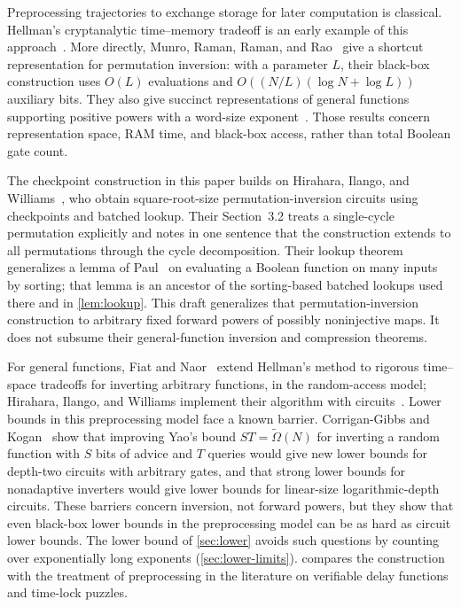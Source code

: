 \documentclass[11pt]{article}
\theoremstyle{definition}
\theoremstyle{remark}
\numberwithin{equation}{section}
\begin{document}
Preprocessing trajectories to exchange storage for later computation is
classical.  Hellman's cryptanalytic time--memory tradeoff is an early
example of this approach~\cite{Hellman80}.  More directly, Munro, Raman,
Raman, and Rao~\cite[Section~3.1]{MRRR12} give a shortcut representation
for permutation inversion: with a parameter $L$, their black-box
construction uses $O(L)$ evaluations and
$O((N/L)(\log N+\log L))$ auxiliary bits.  They also give succinct
representations of general functions supporting positive powers with a
word-size exponent~\cite[Section~5]{MRRR12}.  Those results concern
representation space, RAM time, and black-box access, rather than total
Boolean gate count.

The checkpoint construction in this paper builds on Hirahara, Ilango, and
Williams~\cite[Section~3.2]{HIW24}, who obtain square-root-size
permutation-inversion circuits using checkpoints and batched lookup.
Their Section~3.2 treats a single-cycle permutation explicitly and notes
in one sentence that the construction extends to all permutations through
the cycle decomposition.  Their lookup theorem~\cite[Theorem~2.2]{HIW24}
generalizes a lemma of Paul~\cite[Lemma~2]{Paul76} on evaluating a
Boolean function on many inputs by sorting; that lemma is an ancestor of
the sorting-based batched lookups used there and in
\cref{lem:lookup}.  This draft generalizes
that permutation-inversion construction to arbitrary fixed forward powers
of possibly noninjective maps.  It does not subsume their general-function
inversion and compression theorems.

For general functions, Fiat and Naor~\cite{FN99} extend Hellman's method
to rigorous time--space tradeoffs for inverting arbitrary functions, in
the random-access model; Hirahara, Ilango, and Williams implement their
algorithm with circuits~\cite[Section~3.3]{HIW24}.  Lower bounds in this
preprocessing model face a known barrier.  Corrigan-Gibbs and
Kogan~\cite{CGK19} show that improving Yao's bound $ST=\widetilde\Omega(N)$
for inverting a random function with $S$ bits of advice and $T$ queries
would give new lower bounds for depth-two circuits with arbitrary gates,
and that strong lower bounds for nonadaptive inverters would give lower
bounds for linear-size logarithmic-depth circuits.  These barriers concern
inversion, not forward powers, but they show that even black-box lower
bounds in the preprocessing model can be as hard as circuit lower bounds.
The lower bound of \cref{sec:lower} avoids such questions by counting
over exponentially long exponents (\cref{sec:lower-limits}).   compares the
construction with the treatment of preprocessing in the literature on
verifiable delay functions and time-lock puzzles.
\end{document}
